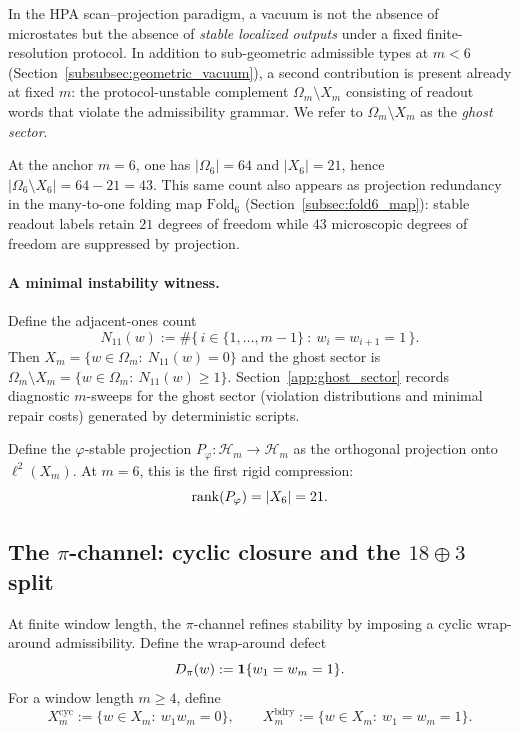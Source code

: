 \begin{remark}\label{rem:ghost_sector_interface}
In the HPA scan--projection paradigm, a vacuum is not the absence of microstates but the absence of \emph{stable localized outputs} under a fixed finite-resolution protocol.
In addition to sub-geometric admissible types at $m<6$ (Section~\ref{subsubsec:geometric_vacuum}), a second contribution is present already at fixed $m$:
the protocol-unstable complement $\Omega_m\setminus X_m$ consisting of readout words that violate the admissibility grammar.
We refer to $\Omega_m\setminus X_m$ as the \emph{ghost sector}.

At the anchor $m=6$, one has $|\Omega_6|=64$ and $|X_6|=21$, hence $|\Omega_6\setminus X_6|=64-21=43$.
This same count also appears as projection redundancy in the many-to-one folding map $\mathrm{Fold}_6$ (Section~\ref{subsec:fold6_map}): stable readout labels retain $21$ degrees of freedom while $43$ microscopic degrees of freedom are suppressed by projection.

\paragraph{A minimal instability witness.}
Define the adjacent-ones count
\[
N_{11}(w):=\#\{\,i\in\{1,\dots,m-1\}\ :\ w_i=w_{i+1}=1\,\}.
\]
Then $X_m=\{w\in\Omega_m:\ N_{11}(w)=0\}$ and the ghost sector is $\Omega_m\setminus X_m=\{w\in\Omega_m:\ N_{11}(w)\ge 1\}$.
Section~\ref{app:ghost_sector} records diagnostic $m$-sweeps for the ghost sector (violation distributions and minimal repair costs) generated by deterministic scripts.
\end{remark}

Define the $\varphi$-stable projection $P_\varphi:\mathcal{H}_m\to \mathcal{H}_m$ as the orthogonal projection onto $\ell^2(X_m)$.
At $m=6$, this is the first rigid compression:
\[
\operatorname{rank}(P_\varphi)=|X_6|=21.
\]

\subsection{The \texorpdfstring{$\pi$}{pi}-channel: cyclic closure and the \texorpdfstring{$18\oplus 3$}{18+3} split}
\label{subsec:pi_channel}

At finite window length, the $\pi$-channel refines stability by imposing a cyclic wrap-around admissibility.
Define the wrap-around defect
\[
D_\pi(w):=\mathbf{1}\{w_1=w_m=1\}.
\]
For a window length $m\ge 4$, define
\[
X_m^{\mathrm{cyc}}:=\{w\in X_m:\ w_1 w_m=0\},
\qquad
X_m^{\mathrm{bdry}}:=\{w\in X_m:\ w_1=w_m=1\}.
\]

